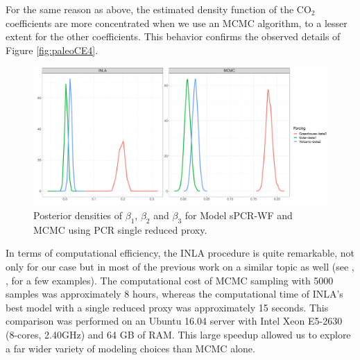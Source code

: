 \documentclass[12pt]{amsart}
\theoremstyle{plain}
\theoremstyle{definition}
\theoremstyle{remark}
\newcommand{\lb}[1]{\color{MidnightBlue}\textbf{[LB: #1]}\normalcolor}
\newcommand{\jeg}[1]{\color{ProcessBlue}\textbf{[JEG: #1]}\normalcolor}
\begin{document}
For the same reason as above, the estimated density
function of the CO$_2$ coefficients are more
concentrated when we use an MCMC algorithm, to a lesser extent for the other 
coefficients. This behavior confirms the observed details of Figure
\ref{fig:paleoCE4}. 

\begin{figure}
  \centering
  \includegraphics[scale=0.3]{PlotBetas}
  \caption{Posterior densities of $\beta_1$, $\beta_2$ and $\beta_3$ for Model
    sPCR-WF and MCMC using PCR single reduced proxy.}
  \label{fig:betas}
\end{figure}

In terms of computational efficiency, the INLA procedure is quite remarkable, not only
for our case but in most of the previous work on a similar topic as well (see \cite{Rue2009},
\cite{Blangiardo2013}, \cite{Ruiz-Cardenas2012} for a few examples). The
computational cost of MCMC sampling with 5000 samples was
approximately 8 hours, whereas the computational time of INLA's best model with
a single reduced proxy was approximately 15 seconds. This comparison
was performed on an Ubuntu 16.04 server with Intel Xeon E5-2630 (8-cores,
2.40GHz) and 64 GB of RAM.  This large speedup allowed us to explore a far wider variety of modeling choices than MCMC alone.




\end{document}
